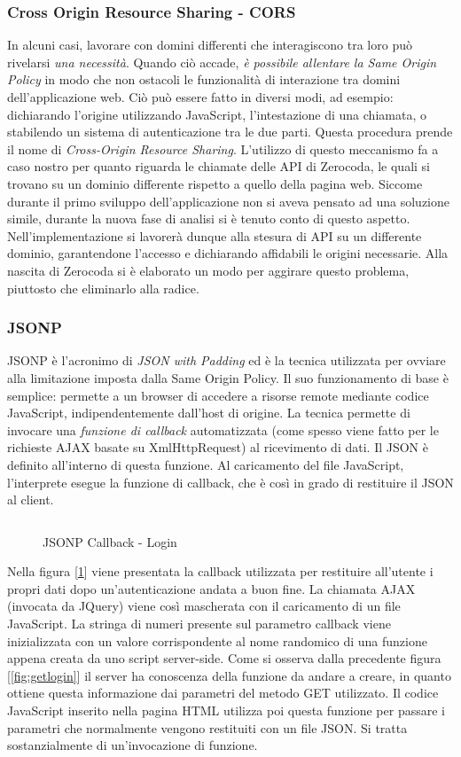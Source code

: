 \subsubsection{Cross Origin Resource Sharing - CORS}
In alcuni casi, lavorare con domini differenti che interagiscono tra loro può rivelarsi \textit{una necessità}. Quando ciò accade, \textit{è possibile allentare la Same Origin Policy} in modo che non ostacoli le funzionalità di interazione tra domini dell’applicazione web. Ciò può essere fatto in diversi modi, ad esempio: dichiarando l'origine utilizzando JavaScript, l'intestazione di una chiamata, o stabilendo un sistema di autenticazione tra le due parti. Questa procedura prende il nome di \textit{Cross-Origin Resource Sharing}. L'utilizzo di questo meccanismo fa a caso nostro per quanto riguarda le chiamate delle API di Zerocoda, le quali si trovano su un dominio differente rispetto a quello della pagina web. Siccome durante il primo sviluppo dell'applicazione non si aveva pensato ad una soluzione simile, durante la nuova fase di analisi si è tenuto conto di questo aspetto. Nell'implementazione si lavorerà dunque alla stesura di API su un differente dominio, garantendone l'accesso e dichiarando affidabili le origini necessarie. Alla nascita di Zerocoda si è elaborato un modo per aggirare questo problema, piuttosto che eliminarlo alla radice.

\subsubsection{JSONP}
JSONP è l’acronimo di \emph{JSON with Padding} ed è la tecnica utilizzata per ovviare alla limitazione imposta dalla Same Origin Policy. Il suo funzionamento di base è semplice: permette a un browser di accedere a risorse remote mediante codice JavaScript, indipendentemente dall’host di origine. La tecnica permette di invocare una \textit{funzione di callback} automatizzata (come spesso viene fatto per le richieste AJAX basate su XmlHttpRequest) al ricevimento di dati. Il JSON è definito all'interno di questa funzione. Al caricamento del file JavaScript, l'interprete esegue la funzione di callback, che è così in grado di restituire il JSON al client.
\begin{figure}[H]
    \inputminted{octave}{src/examples/jsonp.js}
    \caption{JSONP Callback - Login}
    \label{fig:jsonpexample}
\end{figure}
Nella figura [\ref{fig:jsonpexample}] viene presentata la callback utilizzata per restituire all'utente i propri dati dopo un'autenticazione andata a buon fine. La chiamata AJAX (invocata da JQuery) viene così mascherata con il caricamento di un file JavaScript. La stringa di numeri presente sul parametro callback viene inizializzata con un valore corrispondente al nome randomico di una funzione appena creata da uno script server-side. Come si osserva dalla precedente figura [\ref{fig:getlogin}] il server ha conoscenza della funzione da andare a creare, in quanto ottiene questa informazione dai parametri del metodo GET utilizzato. Il codice JavaScript inserito nella pagina HTML utilizza poi questa funzione per passare i parametri che normalmente vengono restituiti con un file JSON. Si tratta sostanzialmente di un'invocazione di funzione.

